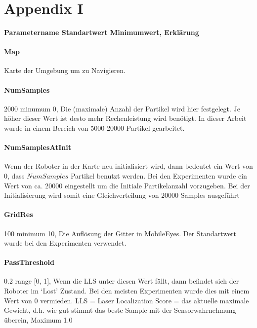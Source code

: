 \documentclass{article}
\begin{document}
\newpage


\appendix
\section{Appendix I}

\paragraph{Parametername Standartwert Minimumwert, Erkl\"arung}

\paragraph{Map}          Karte der Umgebung um zu Navigieren. 

\paragraph{NumSamples} 2000           minumum 0,  Die (maximale) Anzahl der Partikel wird hier festgelegt. Je h\"oher dieser Wert ist desto mehr Rechenleistung wird ben\"otigt. In dieser Arbeit wurde in einem Bereich von 5000-20000 Partikel gearbeitet.

\paragraph{NumSamplesAtInit} Wenn der Roboter in der Karte neu initialisiert wird, dann bedeutet ein Wert von 0, dass $NumSamples$ Partikel benutzt werden. Bei den Experimenten wurde ein Wert von ca. 20000 eingestellt um die Initiale Partikelanzahl vorzugeben. Bei der Initialisierung wird somit eine Gleichverteilung von 20000 Samples ausgef\"uhrt

\paragraph{GridRes} 100               minimum 10,  Die Aufl\"osung der Gitter in MobileEyes. Der Standartwert wurde bei den Experimenten verwendet.

\paragraph{PassThreshold} 0.2         range [0, 1],  
Wenn die LLS unter diesen Wert f\"allt, dann befindet sich der Roboter im `Lost' Zustand. Bei den meisten Experimenten wurde dies mit einem Wert von 0 vermieden.
LLS = Laser Localization Score = das aktuelle maximale Gewicht, d.h. wie gut stimmt das beste Sample mit der Sensorwahrnehmung \"uberein, Maximum 1.0 
\end{document}
